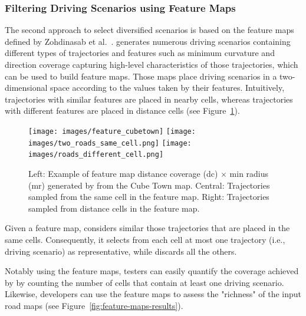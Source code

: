 \documentclass[conference]{IEEEtran}
\begin{document}
\subsubsection{Filtering Driving Scenarios using Feature Maps}
The second approach to select diversified scenarios is based on the feature maps defined by Zohdinasab et al.~\cite{DBLP:conf/issta/ZohdinasabRGT21}. 
%
\tool generates numerous driving scenarios containing different types of trajectories and features such as minimum curvature and direction coverage capturing high-level characteristics of those trajectories, which can be used to build feature maps. Those maps place driving scenarios in a two-dimensional space according to the values taken by their features.
%
Intuitively, trajectories with similar features are placed in nearby cells, whereas trajectories with different features are placed in distance cells (see Figure~\ref{fig:feature-maps}).

\begin{figure}[t]
\texttt{[image: images/feature\_cubetown]}
\endminipage\hfill
{}
\texttt{[image: images/two\_roads\_same\_cell.png]}
\endminipage\hfill
{}%
  \texttt{[image: images/roads\_different\_cell.png]}
\endminipage
\caption{Left: Example of feature map distance coverage (dc) $\times$ min radius (mr) generated by \tool from the Cube Town map. Central: Trajectories sampled from the same cell in the feature map. Right: Trajectories sampled from distance cells in the feature map.}
\label{fig:feature-maps}
\end{figure}

Given a feature map, \tool considers similar those trajectories that are placed in the same cells. Consequently, it selects from each cell at most one trajectory (i.e., driving scenario) as representative, while discards all the others.

Notably using the feature maps, testers can easily quantify the coverage achieved by \tool by counting the number of cells that contain at least one driving scenario. Likewise, developers can use the feature maps to assess the "richness" of the input road maps (see Figure~\ref{fig:feature-maps-results}).


\end{document}
